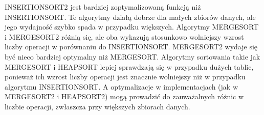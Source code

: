 \documentclass{article}
\begin{document}
	INSERTIONSORT2 jest bardziej zoptymalizowaną funkcją niż INSERTIONSORT. Te algorytmy działą dobrze dla małych zbiorów danych, ale jego wydajność szybko spada w przypadku większych. Algorytmy MERGESORT i MERGESORT2 różnią się, ale oba wykazują stosunkowo wolniejszy wzrost liczby operacji w porównaniu do INSERTIONSORT. MERGESORT2 wydaje się być nieco bardziej optymalny niż MERGESORT. Algorytmy sortowania takie jak MERGESORT i HEAPSORT lepiej sprawdzają się w przypadku dużych tablic, ponieważ ich wzrost liczby operacji jest znacznie wolniejszy niż w przypadku algorytmu INSERTIONSORT. A optymalizacje w implementacjach (jak w MERGESORT2 i HEAPSORT2) mogą prowadzić do zauważalnych różnic w liczbie operacji, zwłaszcza przy większych zbiorach danych.
\end{document}
